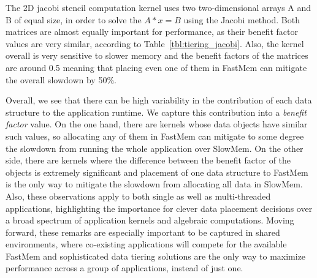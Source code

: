  The 2D jacobi stencil computation kernel uses two two-dimensional arrays {\ttfamily A} and {\ttfamily B} of equal size, in order to solve the $A*x = B$ using the Jacobi method. Both matrices are almost equally important for performance, as their benefit factor values are very similar, according to Table~\ref{tbl:tiering_jacobi}. Also, the kernel overall is very sensitive to slower memory and the benefit factors of the matrices are around 0.5 meaning that placing even one of them in FastMem can mitigate the overall slowdown by 50\%.\\

\vspace{0.3ex}

\noindent Overall, we see that there can be high variability in the contribution of each data structure to the application runtime. We capture this contribution into a {\it benefit factor} value. On the one hand, there are kernels whose data objects have similar such values, so allocating any of them in FastMem can mitigate to some degree the slowdown from running the whole application over SlowMem. On the other side, there are kernels where the difference between the benefit factor of the objects is extremely significant and placement of one data structure to FastMem is the only way to mitigate the slowdown from allocating all data in SlowMem. Also, these observations apply to both single as well as multi-threaded applications, highlighting the importance for clever data placement decisions over a broad spectrum of application kernels and algebraic computations. Moving forward, these remarks are especially important to be captured in shared environments, where 
co-existing applications will compete for the available FastMem and sophisticated data tiering solutions are the only way to maximize performance across a group of applications, instead of just one. 

\begin{comment}
Using Pin we get the number of accesses that each data structure incurs. Metrics such as the size, the access pattern, the access frequency and density are used in related work, in order to 
attribute similar notions of cost on a data object granularity. 
In this way, we validate that the definition of cost, that the related
work provides, is correct and indeed reflects on the actual overall
execution time of the application. For brevity we present the
execution times and benefit calculations and not the raw numbers
related to accesses obtained with Pin. 
\end{comment}

